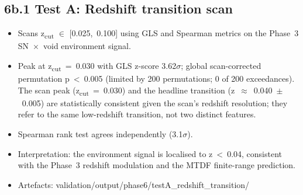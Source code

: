 \documentclass[11pt,a4paper]{article}
\begin{document}
\begin{table}[H]
\end{table}

\subsection{6b.1 Test A: Redshift transition scan}
\begin{itemize}
  \item Scans z\textsubscript{cut} $\in$ [0.025,~0.100] using GLS and Spearman metrics on the Phase~3 SN~$\times$~void environment signal.
  \item Peak at z\textsubscript{cut}~=~0.030 with GLS z-score 3.62$\sigma$; global scan-corrected permutation p~<~0.005 (limited by 200 permutations; 0 of 200 exceedances). The scan peak (z\textsubscript{cut}~=~0.030) and the headline transition (z~$\approx$~0.040~$\pm$~0.005) are statistically consistent given the scan's redshift resolution; they refer to the same low-redshift transition, not two distinct features.
  \item Spearman rank test agrees independently (3.1$\sigma$).
  \item Interpretation: the environment signal is localised to z~<~0.04, consistent with the Phase~3 redshift modulation and the MTDF finite-range prediction.
  \item Artefacts: validation/\allowbreak{}output/\allowbreak{}phase6/\allowbreak{}testA\_\allowbreak{}redshift\_\allowbreak{}transition/\allowbreak{}
\end{itemize}
\end{document}
